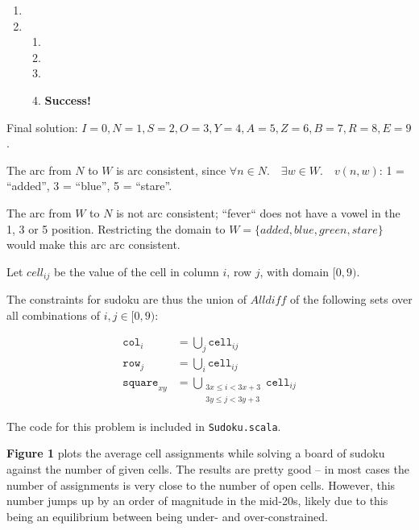 \documentclass[12pt]{article}
\newcommand*\circled[1]{\tikz[baseline=(char.base)]{
            \node[shape=circle,draw,inner sep=2pt] (char) {#1};}}
\begin{document}
\begin{enumerate}
{\begin{enumerate}
        \item {}
        \item {} {
            \begin{enumerate}
            \item {}
            \item \learn{\circled{3}}{A = 5}
            \item \learn{\circled{6}}{Z = 6, B = 7}
            \item \textbf{Success!}
            \end{enumerate}
        }
    \end{enumerate}
}
\end{enumerate}

Final solution: $I = 0, N = 1, S = 2, O = 3, Y = 4, A = 5, Z = 6, B = 7, R = 8, E = 9$.


\problemsub

The arc from $N$ to $W$ is arc consistent, since $\forall n \in N.\quad \exists w \in W.\quad v(n,w)$: 1 = ``added'', 3
=  ``blue'', 5 = ``stare''.

\problemsub

The arc from $W$ to $N$ is not arc consistent; ``fever`` does not have a vowel in the 1, 3 or 5 position. Restricting
the domain to $W = \{added, blue, green, stare\}$ would make this arc arc consistent.


\problemasub

Let $\textit{cell}_{ij}$ be the value of the cell in column $i$, row $j$, with domain $[0, 9)$.

The constraints for sudoku are thus the union of $\textit{Alldiff}$ of the following sets over all combinations of
$i, j \in [0, 9)$:

\begin{align*}
    \texttt{col}_i &= \bigcup_j \texttt{cell}_{ij} \\
    \texttt{row}_j &= \bigcup_i \texttt{cell}_{ij} \\
    \texttt{square}_{xy} &= \bigcup_{\substack{3x \leq i < 3x+3 \\ 3y \leq j < 3y+3}}{\texttt{cell}_{ij}}
\end{align*}

\problemasub

The code for this problem is included in \texttt{Sudoku.scala}.

\problemasub

\textbf{Figure 1} plots the average cell assignments while solving a board of sudoku against the number of given cells.
The results are pretty good -- in most cases the number of assignments is very close to the number of open cells.
However, this number jumps up by an order of magnitude in the mid-20s, likely due to this being an equilibrium between
being under- and over-constrained.
\end{document}
